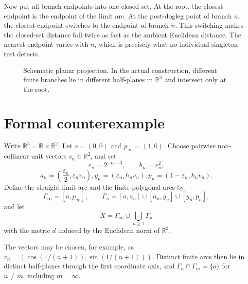 \documentclass[11pt]{article}
\newcommand{\R}{\mathbb{R}}
\begin{document}
Now put all branch endpoints into one closed set. At the root, the closest
endpoint is the endpoint of the limit arc. At the post-dogleg point of branch
$n$, the closest endpoint switches to the endpoint of branch $n$. This
switching makes the closed-set distance fall twice as fast as the ambient
Euclidean distance. The nearest endpoint varies with $n$, which is precisely
what no individual singleton test detects.

\begin{figure}[ht]
\centering
{}
\caption{Schematic planar projection. In the actual construction, different
finite branches lie in different half-planes in $\R^3$ and intersect only at
the root.}
\end{figure}

\section{Formal counterexample}

Write $\R^3=\R\times\R^2$. Let $o=(0,0)$ and
$p_\infty=(1,0)$. Choose pairwise non-collinear unit vectors
$v_n\in\R^2$, and set
\[
  \varepsilon_n=2^{-n-3},\qquad h_n=\varepsilon_n^2,
\]
\[
  a_n=\left(\frac{\varepsilon_n}{2},\varepsilon_n v_n\right),
  y_n=(\varepsilon_n,h_n v_n),
  p_n=(1-\varepsilon_n,h_n v_n).
\]
Define the straight limit arc and the finite polygonal arcs by
\[
  \Gamma_\infty=[o,p_\infty],\qquad
  \Gamma_n=[o,a_n]\cup[a_n,y_n]\cup[y_n,p_n],
\]
and let
\[
  X=\Gamma_\infty\cup\bigcup_{n\geq1}\Gamma_n
\]
with the metric $d$ induced by the Euclidean norm of $\R^3$.

The vectors may be chosen, for example, as
$v_n=(\cos(1/(n+1)),\sin(1/(n+1)))$. Distinct finite arcs then lie in
distinct half-planes through the first coordinate axis, and
$\Gamma_n\cap\Gamma_m=\{o\}$ for $n\ne m$, including $m=\infty$.
\end{document}
